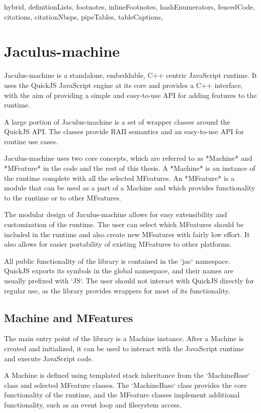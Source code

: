 \begin{markdown*}{%
  hybrid,
  definitionLists,
  footnotes,
  inlineFootnotes,
  hashEnumerators,
  fencedCode,
  citations,
  citationNbsps,
  pipeTables,
  tableCaptions,
}

\chapter{Jaculus-machine} \label{chap:machine}

Jaculus-machine is a standalone, embeddable, C++ centric JavaScript runtime. It uses the QuickJS JavaScript engine at its core and provides a C++ interface, with the aim of providing a simple and easy-to-use API for adding features to the runtime.

A large portion of Jaculus-machine is a set of wrapper classes around the QuickJS API. The classes provide RAII semantics and an easy-to-use API for routine use cases.

Jaculus-machine uses two core concepts, which are referred to as *Machine* and *MFeature* in the code and the rest of this thesis. A *Machine* is an instance of the runtime complete with all the selected MFeatures. An *MFeature* is a module that can be used as a part of a Machine and which provides functionality to the runtime or to other MFeatures.

The modular design of Jaculus-machine allows for easy extensibility and customization of the runtime. The user can select which MFeatures should be included in the runtime and also create new MFeatures with fairly low effort. It also allows for easier portability of existing MFeatures to other platforms.

All public functionality of the library is contained in the `jac` namespace. QuickJS exports its symbols in the global namespace, and their names are usually prefixed with `JS`. The user should not interact with QuickJS directly for regular use, as the library provides wrappers for most of its functionality.

\section{Machine and MFeatures}

The main entry point of the library is a Machine instance. After a Machine is created and initialized, it can be used to interact with the JavaScript runtime and execute JavaScript code.

A Machine is defined using templated stack inheritance from the `MachineBase` class and selected MFeature classes. The `MachineBase` class provides the core functionality of the runtime, and the MFeature classes implement additional functionality, such as an event loop and filesystem access.


\end{markdown*}
